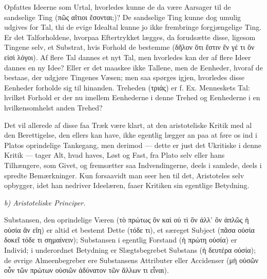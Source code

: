 \documentclass[12pt]{book}
\newcommand{\opage}[1]{\marginnote{\footnotesize\textit{[#1]}}}
\begin{document}
Opfattes Ideerne som Urtal, hvorledes kunne de da være Aarsager til de sandselige Ting (πῶς αἴτιοι
ἔσονται;)? De sandselige Ting kunne dog umulig udgives for Tal, thi de evige Idealtal kunne jo
ikke frembringe forgjængelige Ting. Er det Talforholdene, hvorpaa Eftertrykket lægges, da
forudsætte disse, ligesom Tingene selv, et Substrat, hvis Forhold de bestemme (δῆλον ὅτι ἔστιν ἕν
γέ τι ὂν εἰσὶ λόγοι). Af flere Tal dannes et nyt Tal, men hvorledes kan der af flere Ideer dannes
en ny Idee? Eller er det maaskee ikke Tallene, men de Eenheder, hvoraf de bestaae, der udgjøre
Tingenes Væsen; men saa spørges igjen, hvorledes disse Eenheder forholde sig til hinanden.
Treheden (τριάς) er f. Ex. Menneskets Tal: hvilket Forhold er der nu imellem Eenhederne i denne
Trehed og Eenhederne i en hvilkensomhelst anden Trehed?

Det vil allerede af disse faa Træk være klart, at den aristoteliske Kritik med al den
Berettigelse, den ellers kan have, ikke egentlig lægger an paa at føre os ind i Platos
oprindelige Tankegang, men derimod — dette er just det
\opage{140} Ukritiske i denne Kritik — tager Alt, hvad haves, Løst og Fast, fra Plato selv eller hans
Tilhængere, som Givet, og fremsætter saa Indvendingerne, deels i samlede, deels i spredte
Bemærkninger. Kun forsaavidt man seer hen til det, Aristoteles selv opbygger, idet han nedriver
Ideelæren, faaer Kritiken sin egentlige Betydning.

\emph{b) Aristoteliske Principer.}

Substansen, den oprindelige Væren (τὸ πρώτως ὂν καὶ οὐ τὶ ὂν ἀλλ' ὂν ἁπλῶς ἡ οὐσία ἂν εἴη) er
altid et bestemt Dette (τόδε τι), et særeget Subject (πᾶσα οὐσία δοκεῖ τόδε τι σημαίνειν);
Substansen i egentlig Forstand (ἡ πρώτη οὐσία) er Individ; i underordnet Betydning er
Slægtsbegrebet Substans (ἡ δευτέρα οὐσία); de øvrige Almeenbegreber ere Substansens Attributer
eller Accidenser (μὴ οὐσῶν οὖν τῶν πρώτων οὐσιῶν ἀδύνατον τῶν ἄλλων τι εἶναι).
\end{document}
